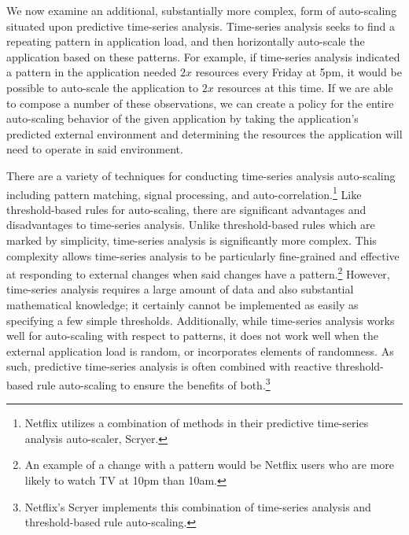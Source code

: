 We now examine an additional, substantially more complex, form of auto-scaling
situated upon predictive time-series analysis. Time-series analysis seeks to
find a repeating pattern in application load, and then horizontally auto-scale
the application based on these
patterns.\cite[pg. 29]{auto-scaling-techniques-for-elastic-applications-in-cloud-environments}
For example, if time-series analysis indicated a pattern in the application needed
$2x$ resources every Friday at 5pm,
it would be possible to auto-scale the application to $2x$
resources at this time. If we are able to compose a number of these
observations, we can create a policy for the entire auto-scaling behavior of
the given application by taking the application's predicted external environment
and determining the resources the application will need to operate in said
environment.

There are a variety of techniques for conducting time-series analysis
auto-scaling including pattern matching, signal processing, and
auto-correlation.\footnote{Netflix utilizes a combination of methods in
their predictive time-series analysis auto-scaler,
Scryer.\cite{netflix-scryer-part-ii}}\cite[pg.
32]{auto-scaling-techniques-for-elastic-applications-in-cloud-environments}
Like threshold-based rules for auto-scaling, there are significant
advantages and disadvantages to time-series analysis. Unlike threshold-based
rules which are marked by simplicity, time-series analysis is significantly more
complex. This complexity allows time-series analysis to be particularly 
fine-grained and effective
at responding to external changes when said changes have a pattern.\footnote{An
example of a change with a pattern would be Netflix users who are more likely to
watch TV at 10pm than 10am.} However, time-series analysis requires a
large amount of data and also substantial mathematical
knowledge; it certainly cannot be implemented as easily as specifying a few
simple thresholds. Additionally, while time-series analysis works well for
auto-scaling with respect to patterns, it does not work well when the external
application load is random, or incorporates elements of randomness. As such,
predictive time-series analysis is
often combined with reactive threshold-based rule auto-scaling to ensure the benefits of
both.\footnote{Netflix's Scryer implements this combination of
time-series analysis and threshold-based rule
auto-scaling.\cite{netflix-scryer-part-ii}}

